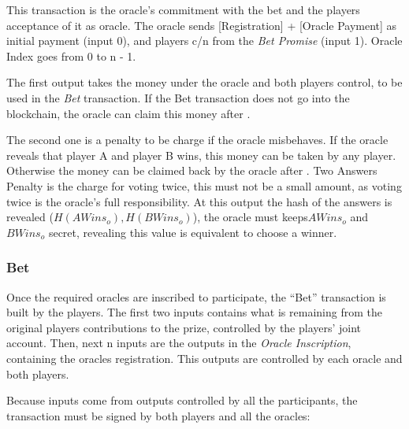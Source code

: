 This transaction is the oracle's commitment with the bet and the players
  acceptance of it as oracle.
The oracle sends [Registration] + [Oracle Payment] as initial payment
  (input 0), and players c/n from the \textit{Bet Promise} (input 1).
Oracle Index goes from 0 to n - 1.

The first output takes the money under the oracle and both players control, to
  be used in the \textit{Bet} transaction.
If the Bet transaction does not go into the blockchain, the oracle can claim
  this money after .

The second one is a penalty to be charge if the oracle misbehaves.
If the oracle reveals that player A and player B wins, this money can be taken
  by any player. Otherwise the money can be claimed back by the oracle after
  .
Two Answers Penalty is the charge for voting twice, this must not be a small
  amount, as voting twice is the oracle's full responsibility.
At this output the hash of the answers is revealed ($H(AWins_o), H(BWins_o)$),
  the oracle must keeps$AWins_o$ and $BWins_o$ secret, revealing this value is
  equivalent to choose a winner.

\subsubsection{Bet}

Once the required oracles are inscribed to participate, the ``Bet'' transaction
  is built by the players.
 The first two inputs contains what is remaining from the original players
   contributions to the prize, controlled by the players' joint account.
Then, next n inputs are the outputs in the \textit{Oracle Inscription},
  containing the oracles registration.
This outputs are controlled by each oracle and both players.

Because inputs come from outputs controlled by all the participants, the
  transaction must be signed by both players and all the oracles:

